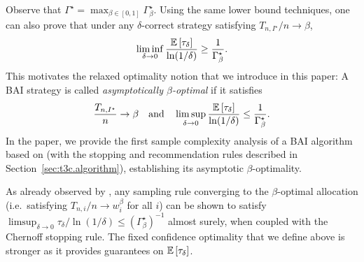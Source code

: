 Observe that $\Gamma^\star = \max_{\beta \in [0,1]} \Gamma_\beta^\star$. Using the same lower bound techniques, one can also prove that under any $\delta$-correct strategy satisfying $T_{n,I^\star}/n \rightarrow \beta$,
\[\liminf_{\delta \rightarrow 0}\frac{\mathbb{E}\left[\tau_\delta\right]}{\ln(1/\delta)} \geq \frac{1}{\Gamma^\star_\beta}.\]
This motivates the relaxed optimality notion that we introduce in this paper: A BAI strategy is called \emph{asymptotically $\beta$-optimal} if it satisfies 
\[\frac{T_{n,I^\star}}{n}\rightarrow \beta \ \ \ \text{and} \ \ \ \limsup_{\delta \rightarrow 0}\frac{\EE{\tau_\delta}}{\ln(1/\delta)} \leq \frac{1}{\Gamma^\star_\beta}.\]
In the paper, we provide the first sample complexity analysis of a BAI algorithm based on \TTTS (with the stopping and recommendation rules described in Section~\ref{sec:t3c.algorithm}), establishing its asymptotic $\beta$-optimality.

As already observed by \cite{qin2017ttei}, any sampling rule converging to the $\beta$-optimal allocation (i.e.\ satisfying $T_{n,i}/n \rightarrow w_i^\beta$ for all $i$) can be shown to satisfy $\limsup_{\delta \rightarrow 0} \tau_\delta/\ln(1/\delta) \leq (\Gamma_\beta^\star)^{-1}$ almost surely,  when coupled with the Chernoff stopping rule. The fixed confidence optimality that we define above is stronger as it provides guarantees on $\mathbb{E}\left[\tau_\delta\right]$.

